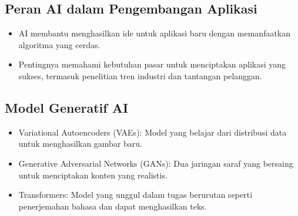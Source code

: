 \documentclass{article}
\begin{document}
\subsection{Peran AI dalam Pengembangan Aplikasi}
\begin{itemize}
    \item AI membantu menghasilkan ide untuk aplikasi baru dengan memanfaatkan algoritma yang cerdas.
    \item Pentingnya memahami kebutuhan pasar untuk menciptakan aplikasi yang sukses, termasuk penelitian tren industri dan tantangan pelanggan.
\end{itemize}

\subsection{Model Generatif AI}
\begin{itemize}
    \item Variational Autoencoders (VAEs): Model yang belajar dari distribusi data untuk menghasilkan gambar baru.
    \item Generative Adversarial Networks (GANs): Dua jaringan saraf yang bersaing untuk menciptakan konten yang realistis.
    \item Transformers: Model yang unggul dalam tugas berurutan seperti penerjemahan bahasa dan dapat menghasilkan teks.
\end{itemize}
\end{document}
